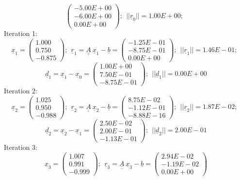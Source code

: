 \documentclass{report}[10pts]
\begin{document}
\begin{small}
\[\begin{pmatrix}
   -5.00E+00 \\ -6.00E+00 \\ 0.00E+00
   \end{pmatrix}
;~~
||
\underline{r}_{0}
||=
1.00E+00
;~~
\]
Iteration 1:
\[
\underline{x}_{1}=
   \begin{pmatrix}
   1.000 \\ 0.750 \\ -0.875
   \end{pmatrix}
;~~
\underline{r}_{1}=
\underline{\underline{A}}~\underline{x}_{1}-
\underline{b}=
   \begin{pmatrix}
   -1.25E-01 \\ -8.75E-01 \\ 0.00E+00
   \end{pmatrix}
;~~
||
\underline{r}_{1}
||=
1.46E-01
;~~
\]
\[
\underline{d}_{1}=
\underline{x}_{1}-
\underline{x}_{0}=
   \begin{pmatrix}
   1.00E+00 \\ 7.50E-01 \\ -8.75E-01
   \end{pmatrix}
;~~
||
\underline{d}_{1}
||=
0.00E+00
\]
Iteration 2:
\[
\underline{x}_{2}=
   \begin{pmatrix}
   1.025 \\ 0.950 \\ -0.988
   \end{pmatrix}
;~~
\underline{r}_{2}=
\underline{\underline{A}}~\underline{x}_{2}-
\underline{b}=
   \begin{pmatrix}
   8.75E-02 \\ -1.12E-01 \\ -8.88E-16
   \end{pmatrix}
;~~
||
\underline{r}_{2}
||=
1.87E-02
;~~
\]
\[
\underline{d}_{2}=
\underline{x}_{2}-
\underline{x}_{1}=
   \begin{pmatrix}
   2.50E-02 \\ 2.00E-01 \\ -1.13E-01
   \end{pmatrix}
;~~
||
\underline{d}_{2}
||=
2.00E-01
\]
Iteration 3:
\[
\underline{x}_{3}=
   \begin{pmatrix}
   1.007 \\ 0.991 \\ -0.999
   \end{pmatrix}
;~~
\underline{r}_{3}=
\underline{\underline{A}}~\underline{x}_{3}-
\underline{b}=
   \begin{pmatrix}
   2.94E-02 \\ -1.19E-02 \\ 0.00E+00

\end{pmatrix}\]
\end{small}
\end{document}
